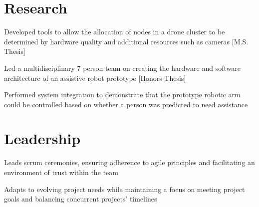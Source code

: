 \documentclass[]{deedy-resume-openfont}
\begin{document}
\begin{minipage}[t]{0.7\textwidth}
\section{Research}
\descript{} 
\begin{tightemize}
\item Developed tools to allow the allocation of nodes in a drone cluster to be determined by hardware quality and additional resources such as cameras [M.S. Thesis]
\item Led a multidisciplinary 7 person team on creating the hardware and software architecture of an assistive robot prototype [Honors Thesis]
\item Performed system integration to demonstrate that the prototype robotic arm could be controlled based on whether a person was predicted to need assistance 
\end{tightemize}
\sectionsep



\section{Leadership}
\begin{tightemize}
\item Leads scrum ceremonies, ensuring adherence to agile principles and facilitating an environment of trust within the team
\item Adapts to evolving project needs while maintaining a focus on meeting project goals and balancing concurrent projects' timelines
\end{tightemize}
\sectionsep


\end{minipage}
\end{document}
